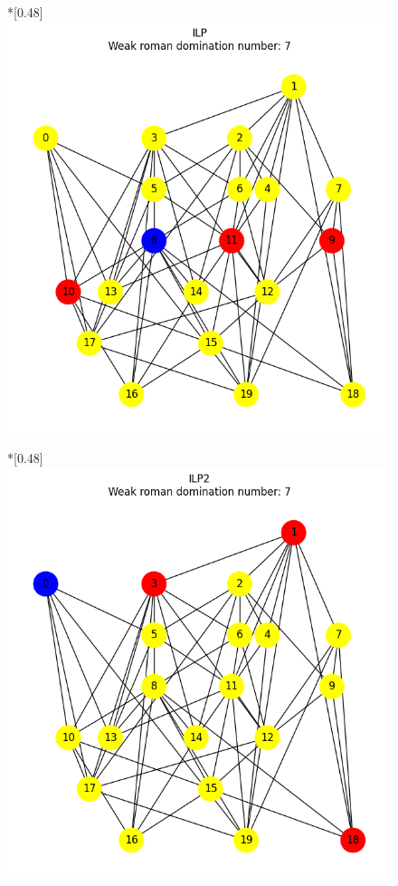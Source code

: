     \begin{figure}[H]
        \centering
        \begin{subcaptionbox}*{}[0.48\linewidth]
            {\includegraphics[width=0.75\linewidth]{assets/plots/ILP/ErdosRenyi_sparse_n20_i2_results.png}}
        \end{subcaptionbox}
        \hfill
        \begin{subcaptionbox}*{}[0.48\linewidth]
            {\includegraphics[width=0.75\linewidth]{assets/plots/ILP2/ErdosRenyi_sparse_n20_i2_results.png}}
        \end{subcaptionbox}

\end{figure}
